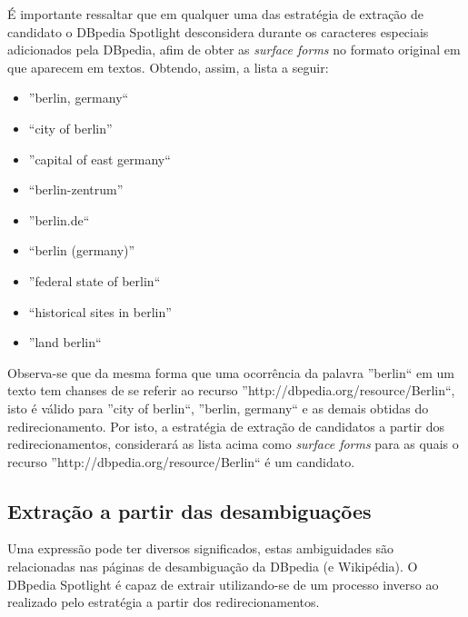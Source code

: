 \documentclass[10pt,a4paper]{llncs}
\begin{document}
É importante ressaltar que em qualquer uma das estratégia de extração de candidato o DBpedia Spotlight desconsidera durante os caracteres especiais adicionados pela DBpedia, afim de obter as \textit{surface forms} no formato original em que aparecem em textos. Obtendo, assim, a lista a seguir:
\begin{itemize}
 \item ''berlin, germany``
 \item ``city of berlin''
 \item ''capital of east germany``
 \item ``berlin-zentrum''
 \item ''berlin.de``
 \item ``berlin (germany)''
 \item ''federal state of berlin``
 \item ``historical sites in berlin''
 \item ''land berlin``
\end{itemize}

Observa-se que da mesma forma que uma ocorrência da palavra ''berlin`` em um texto tem chanses de se referir ao recurso ''http://dbpedia.org/resource/Berlin``, isto é válido para ''city of berlin``, ''berlin, germany`` e as demais obtidas do redirecionamento. Por isto, a estratégia de extração de candidatos a partir dos redirecionamentos, considerará as lista acima como \textit{surface forms} para as quais o recurso ''http://dbpedia.org/resource/Berlin`` é um candidato.

\subsection{Extração a partir das desambiguações} \label{extracao-disambiguacoes}
\indent\indent Uma expressão pode ter diversos significados, estas ambiguidades são relacionadas nas páginas de desambiguação da DBpedia (e Wikipédia). O DBpedia Spotlight é capaz de extrair utilizando-se de um processo inverso ao realizado pelo estratégia a partir dos redirecionamentos.
\end{document}
